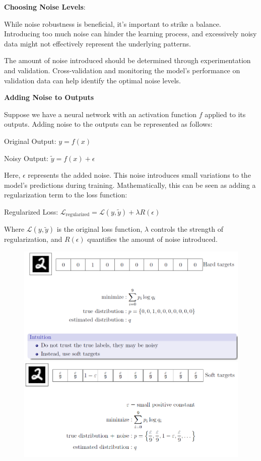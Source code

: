 \documentclass{report}
\begin{document}
\textbf{Choosing Noise Levels}:

While noise robustness is beneficial, it's important to strike a balance. Introducing too much noise can hinder the learning process, and excessively noisy data might not effectively represent the underlying patterns.

The amount of noise introduced should be determined through experimentation and validation. Cross-validation and monitoring the model's performance on validation data can help identify the optimal noise levels.

\textbf{Adding Noise to Outputs}

Suppose we have a neural network with an activation function \( f \) applied to its outputs. Adding noise to the outputs can be represented as follows:

Original Output: \( y = f(x) \)

Noisy Output: \( \tilde{y} = f(x) + \epsilon \)

Here, \( \epsilon \) represents the added noise. This noise introduces small variations to the model's predictions during training. Mathematically, this can be seen as adding a regularization term to the loss function:

Regularized Loss: \( \mathcal{L}_\text{regularized} = \mathcal{L}(y, \tilde{y}) + \lambda R(\epsilon) \)

Where \( \mathcal{L}(y, \tilde{y}) \) is the original loss function, \( \lambda \) controls the strength of regularization, and \( R(\epsilon) \) quantifies the amount of noise introduced.

\begin{figure}[ht]
	\includegraphics[width=450pt]{20}
	\includegraphics[width=450pt]{21}
	\centering
\end{figure}
\end{document}
